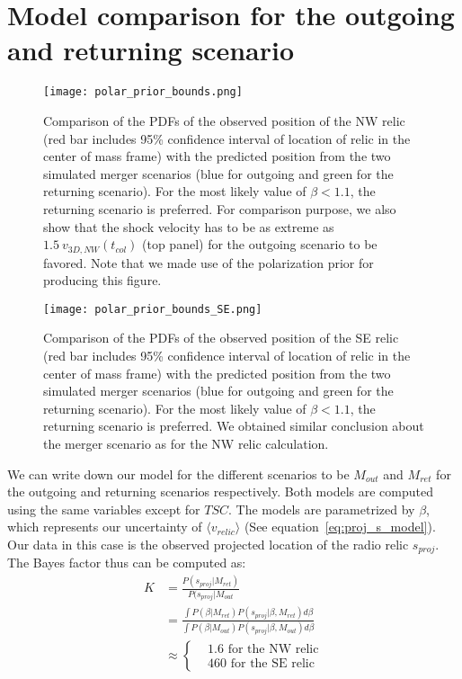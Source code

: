 \section{Model comparison for the outgoing and returning scenario}
\label{app:Bayes_factor}
\begin{figure}
	\texttt{[image: polar\_prior\_bounds.png]}
	\caption{Comparison of the PDFs of the observed position of the NW relic (red bar
		includes 95\% confidence interval of location of relic in the center of
		mass frame) with the	predicted position from the two simulated merger scenarios (blue for
	outgoing and green for the returning scenario). 
	For the most likely value of $\beta < 1.1$, the returning scenario is preferred. 
	For comparison purpose, we also show that the shock velocity has to
	be as extreme as $1.5~v_{3D, NW}(t_{col})$ (top panel) for the outgoing
	scenario to be favored. 
	Note that we made use of the	polarization prior for producing this figure. 
	\label{fig: positionprior}}
\end{figure}
\begin{figure}
	\texttt{[image: polar\_prior\_bounds\_SE.png]}
	\caption{Comparison of the PDFs of the observed position of the SE relic (red bar
		includes 95\% confidence interval of location of relic in the center of
		mass frame) with the	predicted position from the two simulated merger scenarios (blue for
	outgoing and green for the returning scenario). 
	For the most likely value of $\beta < 1.1$, the returning scenario is preferred. 
	We obtained similar conclusion about the merger scenario as for the NW
	relic calculation.
	\label{fig:positionprior_SE}}
\end{figure}
We can write down our model for the different scenarios to be $M_{out}$ and
$M_{ret}$ for the outgoing and returning scenarios respectively. Both
models are computed using the same variables except for $TSC$. The models
are parametrized by $\beta$, which represents our uncertainty of $\langle v_{relic} \rangle$
(See equation~\ref{eq:proj_s_model}). Our data in this
case is the observed projected location of the radio relic $s_{proj}$. 
The Bayes factor thus can be computed as: 
\begin{align}
	K &= \frac{P(s_{proj} | M_{ret})}{P(s_{proj}| M_{out}}\\
	 &= \frac
	 {\int P(\beta | M_{ret}) P(s_{proj} | \beta, M_{ret}) d\beta}
	 {\int P(\beta | M_{out}) P(s_{proj} | \beta, M_{out})
 d\beta}\\
 &\approx 
 \begin{cases}
 & 1.6 \text{ for the NW relic}\\
 & 460 \text{ for the SE relic}
 \end{cases}
\end{align}
